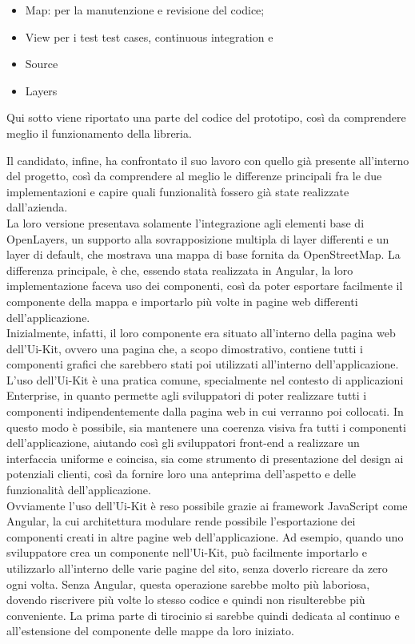 \begin{itemize}
    \item Map: per la manutenzione e revisione del codice;
    \item View per i test test cases, continuous integration e
    \item Source
    \item Layers
\end{itemize}
Qui sotto viene riportato una parte del codice del prototipo, così da comprendere meglio il funzionamento della libreria.


Il candidato, infine, ha confrontato il suo lavoro con quello già presente all'interno del progetto, così da comprendere al meglio le differenze principali fra le due implementazioni e capire quali funzionalità fossero già state realizzate dall'azienda.
\\La loro versione presentava solamente l'integrazione agli elementi base di OpenLayers, un supporto alla sovrapposizione multipla di layer differenti e un layer di default, che mostrava una mappa di base fornita da OpenStreetMap. La differenza principale, è che, essendo stata realizzata in Angular, la loro implementazione faceva uso dei componenti, così da poter esportare facilmente il componente della mappa e importarlo più volte in pagine web differenti dell'applicazione.
\\Inizialmente, infatti, il loro componente era situato all'interno della pagina web dell'Ui-Kit, ovvero una pagina che, a scopo dimostrativo, contiene tutti i componenti grafici che sarebbero stati poi utilizzati all'interno dell'applicazione. L'uso dell'Ui-Kit è una pratica comune, specialmente nel contesto di applicazioni Enterprise, in quanto permette agli sviluppatori di poter realizzare tutti i componenti indipendentemente dalla pagina web in cui verranno poi collocati. In questo modo è possibile, sia mantenere una coerenza visiva fra tutti i componenti dell'applicazione, aiutando così gli sviluppatori front-end a realizzare un interfaccia uniforme e coincisa, sia come strumento di presentazione del design ai potenziali clienti, così da fornire loro una anteprima dell'aspetto e delle funzionalità dell'applicazione.
\\Ovviamente l'uso dell'Ui-Kit è reso possibile grazie ai framework JavaScript come Angular, la cui architettura modulare rende possibile l'esportazione dei componenti creati in altre pagine web dell'applicazione. Ad esempio, quando uno sviluppatore crea un componente nell'Ui-Kit, può facilmente importarlo e utilizzarlo all'interno delle varie pagine del sito, senza doverlo ricreare da zero ogni volta. Senza Angular, questa operazione sarebbe molto più laboriosa, dovendo riscrivere più volte lo stesso codice e quindi non risulterebbe più conveniente. La prima parte di tirocinio si sarebbe quindi dedicata al continuo e all'estensione del componente delle mappe da loro iniziato.
